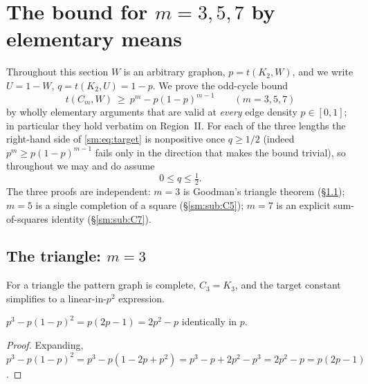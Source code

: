 \providecommand{\one}{\mathbf 1}
\providecommand{\norm}[1]{\lVert #1\rVert}
\providecommand{\ip}[2]{\langle #1,#2\rangle}
\providecommand{\texorpdfstring}[2]{#1}

\section{The bound for \texorpdfstring{$m=3,5,7$}{m=3,5,7} by elementary means}
\label{sm:sec:elem357}

Throughout this section $W$ is an arbitrary graphon, $p=t(K_2,W)$, and we
write $U=1-W$, $q=t(K_2,U)=1-p$.  We prove the odd-cycle bound
\begin{equation}\label{sm:eq:target}
        t(C_m,W)\ \ge\ p^{m}-p(1-p)^{m-1}
        \qquad(m=3,5,7)
\end{equation}
by wholly elementary arguments that are valid at \emph{every} edge density
$p\in[0,1]$; in particular they hold verbatim on Region~II.  For each of the
three lengths the right-hand side of \eqref{sm:eq:target} is nonpositive once
$q\ge 1/2$ (indeed $p^m\ge p(1-p)^{m-1}$ fails only in the direction that makes
the bound trivial), so throughout we may and do assume
\[
        0\le q\le \tfrac12 .
\]
The three proofs are independent: $m=3$ is Goodman's triangle theorem
(\S\ref{sm:sub:C3}); $m=5$ is a single completion of a square
(\S\ref{sm:sub:C5}); $m=7$ is an explicit sum-of-squares identity
(\S\ref{sm:sub:C7}).

\subsection{The triangle: \texorpdfstring{$m=3$}{m=3}}\label{sm:sub:C3}

For a triangle the pattern graph is complete, $C_3=K_3$, and the target
constant simplifies to a linear-in-$p^2$ expression.

\begin{lemma}\label{sm:lem:g3}
$\displaystyle p^{3}-p(1-p)^{2}=p(2p-1)=2p^{2}-p$ identically in $p$.
\end{lemma}

\begin{proof}
Expanding, $p^3-p(1-p)^2=p^3-p(1-2p+p^2)=p^3-p+2p^2-p^3=2p^2-p=p(2p-1)$.
\end{proof}

